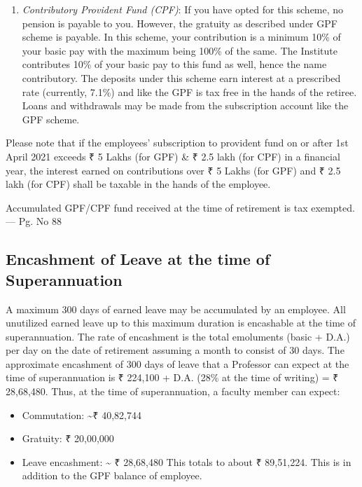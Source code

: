 \documentclass[
  10pt,
  a5paper,
  10pt,
  openany]{amsbook}
\providecommand{\tightlist}{%
  \setlength{\itemsep}{0pt}\setlength{\parskip}{0pt}}
\begin{document}
\begin{enumerate}
\def\labelenumi{\arabic{enumi}.}
\setcounter{enumi}{1}
\tightlist
\item
  \emph{Contributory Provident Fund (CPF)}: If you have opted for this
  scheme, no pension is payable to you. However, the gratuity as
  described under GPF scheme is payable. In this scheme, your
  contribution is a minimum 10\% of your basic pay with the maximum
  being 100\% of the same. The Institute contributes 10\% of your basic
  pay to this fund as well, hence the name contributory. The deposits
  under this scheme earn interest at a prescribed rate (currently,
  7.1\%) and like the GPF is tax free in the hands of the retiree. Loans
  and withdrawals may be made from the subscription account like the GPF
  scheme.
\end{enumerate}

Please note that if the employees' subscription to provident fund on or
after 1st April 2021 exceeds ₹ 5 Lakhs (for GPF) \& ₹ 2.5 lakh (for CPF)
in a financial year, the interest earned on contributions over ₹ 5 Lakhs
(for GPF) and ₹ 2.5 lakh (for CPF) shall be taxable in the hands of the
employee.

Accumulated GPF/CPF fund received at the time of retirement is tax
exempted. --- Pg. No 88

\subsection{Encashment of Leave at the time of
Superannuation}\label{encashment-of-leave-at-the-time-of-superannuation}

A maximum 300 days of earned leave may be accumulated by an employee.
All unutilized earned leave up to this maximum duration is encashable at
the time of superannuation. The rate of encashment is the total
emoluments (basic + D.A.) per day on the date of retirement assuming a
month to consist of 30 days. The approximate encashment of 300 days of
leave that a Professor can expect at the time of superannuation is ₹
224,100 + D.A. (28\% at the time of writing) = ₹ 28,68,480. Thus, at the
time of superannuation, a faculty member can expect:

\begin{itemize}
\tightlist
\item
  Commutation: \textasciitilde₹ 40,82,744
\item
  Gratuity: ₹ 20,00,000
\item
  Leave encashment: \textasciitilde{} ₹ 28,68,480 This totals to about ₹
  89,51,224. This is in addition to the GPF balance of employee.
\end{itemize}
\end{document}
